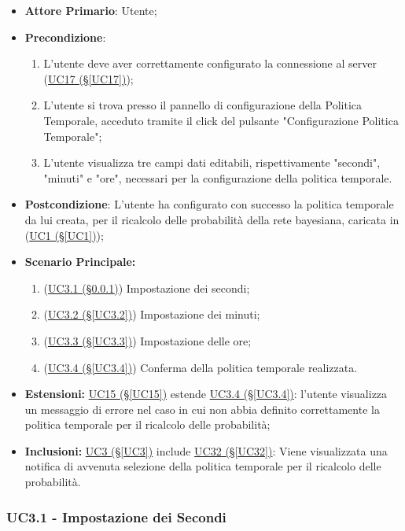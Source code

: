 \begin{itemize}
	\item \textbf{Attore Primario}: Utente;
	\item \textbf{Precondizione}:
		\begin{enumerate}
			\item L'utente deve aver correttamente configurato la connessione al server (\hyperref[UC17]{UC17 (§\ref*{UC17})});
			\item L'utente si trova presso il pannello di configurazione della Politica Temporale, acceduto tramite il click del pulsante "Configurazione Politica Temporale";
			\item L'utente visualizza tre campi dati editabili, rispettivamente "secondi", "minuti" e "ore", necessari per la configurazione della politica temporale.
		\end{enumerate}
	\item \textbf{Postcondizione}: L'utente ha configurato con successo la politica temporale da lui creata, per il ricalcolo delle probabilità della rete bayesiana, caricata in (\hyperref[UC1]{UC1 (§\ref*{UC1})});
	\item \textbf{Scenario Principale:}
	\begin{enumerate}
		\item (\hyperref[UC3.1]{UC3.1 (§\ref*{UC3.1})}) Impostazione dei secondi;
		\item (\hyperref[UC3.2]{UC3.2 (§\ref*{UC3.2})}) Impostazione dei minuti;
		\item (\hyperref[UC3.3]{UC3.3 (§\ref*{UC3.3})}) Impostazione delle ore;
		\item (\hyperref[UC3.4]{UC3.4 (§\ref*{UC3.4})}) Conferma della politica temporale realizzata.
	\end{enumerate}
	\item \textbf{Estensioni:} \hyperref[UC15]{UC15 (§\ref*{UC15})} estende \hyperref[UC3.4]{UC3.4 (§\ref*{UC3.4})}: l'utente visualizza un messaggio di errore nel caso in cui non abbia definito correttamente la politica temporale per il ricalcolo delle probabilità;
	\item \textbf{Inclusioni:} \hyperref[UC3]{UC3 (§\ref*{UC3})} include \hyperref[UC32]{UC32 (§\ref*{UC32})}: Viene visualizzata una notifica di avvenuta selezione della politica temporale per il ricalcolo delle probabilità.
\end{itemize}

\pagebreak

\subsubsection{UC3.1 - Impostazione dei Secondi}\label{UC3.1}

